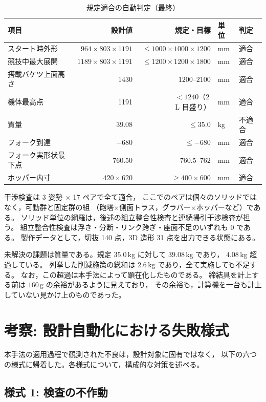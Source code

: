 \documentclass[a4paper,10pt,twocolumn]{ltjsarticle}
\begin{document}
\begin{table}[t]
\centering\footnotesize
\caption{規定適合の自動判定（最終）}
\label{tab:result}
\begin{tabular}{lrrll}
\toprule
項目 & 設計値 & 規定・目標 & 単位 & 判定\\
\midrule
スタート時外形 & $964\times803\times1191$ & $\le1000\times1000\times1200$ & mm & 適合\\
競技中最大展開 & $1189\times803\times1191$ & $\le1200\times1200\times1800$ & mm & 適合\\
搭載バケツ上面高さ & 1430 & $1200$--$2100$ & mm & 適合\\
機体最高点 & 1191 & $<1240$（$2\,$L 目盛り）& mm & 適合\\
質量 & 39.08 & $\le35.0$ & kg & 不適合\\
フォーク到達 & $-680$ & $\le-680$ & mm & 適合\\
フォーク実形状最下点 & 760.50 & $760.5$--$762$ & mm & 適合\\
ホッパー内寸 & $420\times620$ & $\ge400\times600$ & mm & 適合\\
\bottomrule
\end{tabular}
\end{table}

干渉検査は 3 姿勢 $\times$ 17 ペアで全て適合，
ここでのペアは個々のソリッドではなく，可動群と固定群の組
（砲塔$\times$側面トラス，グラバー$\times$ホッパーなど）である。
ソリッド単位の網羅は，後述の組立整合性検査と連続掃引干渉検査が担う。
組立整合性検査は浮き・分断・リンク跨ぎ・座面不足のいずれも 0 である。
製作データとして，切抜 140 点，3D 造形 31 点を出力できる状態にある。

未解決の課題は質量である。規定 $35.0\,$kg に対して $39.08\,$kg であり，
$4.08\,$kg 超過している。
列挙した削減施策の総和は $2.6\,$kg であり，全て実施しても不足する。
なお，この超過は本手法によって顕在化したものである。
締結具を計上する前は $160\,$g の余裕があるように見えており，
その余裕も，計算機を一台も計上していない見かけ上のものであった。

\section{考察: 設計自動化における失敗様式}

本手法の適用過程で観測された不良は，設計対象に固有ではなく，
以下の六つの様式に帰着した。各様式について，構成的な対策を述べる。

\subsection{様式 1: 検査の不作動}
\end{document}
